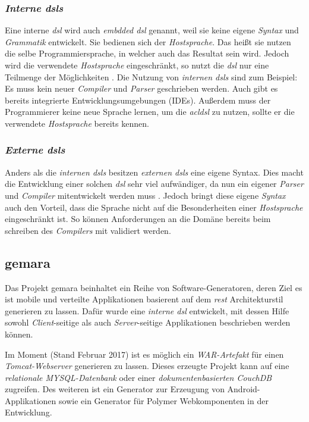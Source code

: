 \subsubsection{\textit{Interne \acsp{dsl}}} \label{sec:intern}
Eine interne \textit{\acs{dsl}} wird auch \textit{embdded \acs{dsl}} genannt, weil sie keine eigene \textit{Syntax} und \textit{Grammatik} entwickelt. Sie bedienen sich der \textit{Hostsprache}. Das heißt sie nutzen die selbe Programmiersprache, in welcher auch das Resultat sein wird.
Jedoch wird die verwendete \textit{Hostsprache} eingeschränkt, so nutzt die \textit{\acl{dsl}} nur eine Teilmenge der Möglichkeiten \cite{dsl}. Die Nutzung von \textit{internen \acsp{dsl}} sind zum Beispiel: Es muss kein neuer \textit{Compiler} und \textit{Parser} geschrieben werden. Auch gibt es bereits integrierte Entwicklungsumgebungen (IDEs). Außerdem muss der Programmierer keine neue Sprache lernen, um die \textit{acl{dsl}} zu nutzen, sollte er die verwendete \textit{Hostsprache} bereits kennen. 

\subsubsection{\textit{Externe \acsp{dsl}}} \label{sec:extern}

Anders als die \textit{internen \acsp{dsl}} besitzen \textit{externen \acsp{dsl}} eine eigene Syntax. Dies macht die Entwicklung einer solchen \textit{\acl{dsl}} sehr viel aufwändiger, da nun ein eigener \textit{Parser} und \textit{Compiler} mitentwickelt werden muss \cite{dsl}. Jedoch bringt diese eigene \textit{Syntax} auch den Vorteil, dass die Sprache nicht auf die Besonderheiten einer \textit{Hostsprache} eingeschränkt ist. So können Anforderungen an die Domäne bereits beim schreiben des \textit{Compilers} mit validiert werden.

\subsection{\acf{gemara}}\label{sec:gemara}

Das Projekt \acs{gemara} beinhaltet ein Reihe von Software-Generatoren, deren Ziel es ist mobile und verteilte Applikationen basierent auf dem \textit{\acs{rest}} Architekturstil generieren zu lassen. Dafür wurde eine \textit{interne \acs{dsl}} entwickelt, mit dessen Hilfe sowohl \textit{Client}-seitige als auch \textit{Server}-seitige Applikationen beschrieben werden können.

Im Moment (Stand Februar 2017) ist es möglich ein \textit{WAR-Artefakt} für einen \textit{Tomcat-Webserver} generieren zu lassen. Dieses erzeugte Projekt kann auf eine \textit{relationale MYSQL-Datenbank} oder einer \textit{dokumentenbasierten CouchDB} zugreifen. Des weiteren ist ein Generator zur Erzeugung von Android-Applikationen sowie ein Generator für Polymer Webkomponenten in der Entwicklung.

